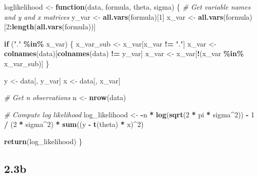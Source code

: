 \documentclass[
]{article}
\newenvironment{Shaded}{\begin{snugshade}}{\end{snugshade}}
\newcommand{\CommentTok}[1]{\textcolor[rgb]{0.56,0.35,0.01}{\textit{#1}}}
\newcommand{\ControlFlowTok}[1]{\textcolor[rgb]{0.13,0.29,0.53}{\textbf{#1}}}
\newcommand{\DecValTok}[1]{\textcolor[rgb]{0.00,0.00,0.81}{#1}}
\newcommand{\FunctionTok}[1]{\textcolor[rgb]{0.13,0.29,0.53}{\textbf{#1}}}
\newcommand{\NormalTok}[1]{#1}
\newcommand{\OtherTok}[1]{\textcolor[rgb]{0.56,0.35,0.01}{#1}}
\newcommand{\SpecialCharTok}[1]{\textcolor[rgb]{0.81,0.36,0.00}{\textbf{#1}}}
\newcommand{\StringTok}[1]{\textcolor[rgb]{0.31,0.60,0.02}{#1}}
\begin{document}
\begin{Shaded}
\begin{Highlighting}[]
\NormalTok{loglikelihood }\OtherTok{\textless{}{-}} \ControlFlowTok{function}\NormalTok{(data, formula, theta, sigma) \{}
  \CommentTok{\# Get variable names and y and x matrices}
\NormalTok{  y\_var }\OtherTok{\textless{}{-}} \FunctionTok{all.vars}\NormalTok{(formula)[}\DecValTok{1}\NormalTok{]}
\NormalTok{  x\_var }\OtherTok{\textless{}{-}} \FunctionTok{all.vars}\NormalTok{(formula)[}\DecValTok{2}\SpecialCharTok{:}\FunctionTok{length}\NormalTok{(}\FunctionTok{all.vars}\NormalTok{(formula))]}
  
  \ControlFlowTok{if}\NormalTok{ (}\StringTok{"."} \SpecialCharTok{\%in\%}\NormalTok{ x\_var) \{}
\NormalTok{    x\_var\_sub }\OtherTok{\textless{}{-}}\NormalTok{ x\_var[x\_var }\SpecialCharTok{!=} \StringTok{"."}\NormalTok{]}
\NormalTok{    x\_var }\OtherTok{\textless{}{-}} \FunctionTok{colnames}\NormalTok{(data)[}\FunctionTok{colnames}\NormalTok{(data) }\SpecialCharTok{!=}\NormalTok{ y\_var]}
\NormalTok{    x\_var }\OtherTok{\textless{}{-}}\NormalTok{ x\_var[}\SpecialCharTok{!}\NormalTok{(x\_var }\SpecialCharTok{\%in\%}\NormalTok{ x\_var\_sub)]}
\NormalTok{  \}}
  
\NormalTok{  y }\OtherTok{\textless{}{-}}\NormalTok{ data[, y\_var]}
\NormalTok{  x }\OtherTok{\textless{}{-}}\NormalTok{ data[, x\_var]}
  
  \CommentTok{\# Get n observations}
\NormalTok{  n }\OtherTok{\textless{}{-}} \FunctionTok{nrow}\NormalTok{(data)}
  
  \CommentTok{\# Compute log likelihood}
\NormalTok{  log\_likelihood }\OtherTok{\textless{}{-}} \SpecialCharTok{{-}}\NormalTok{n }\SpecialCharTok{*} \FunctionTok{log}\NormalTok{(}\FunctionTok{sqrt}\NormalTok{(}\DecValTok{2} \SpecialCharTok{*}\NormalTok{ pi }\SpecialCharTok{*}\NormalTok{ sigma}\SpecialCharTok{\^{}}\DecValTok{2}\NormalTok{)) }\SpecialCharTok{{-}} \DecValTok{1} \SpecialCharTok{/}\NormalTok{ (}\DecValTok{2} \SpecialCharTok{*}\NormalTok{ sigma}\SpecialCharTok{\^{}}\DecValTok{2}\NormalTok{) }\SpecialCharTok{*} \FunctionTok{sum}\NormalTok{((y }\SpecialCharTok{{-}} \FunctionTok{t}\NormalTok{(theta) }\SpecialCharTok{*}\NormalTok{ x)}\SpecialCharTok{\^{}}\DecValTok{2}\NormalTok{)}
  
  \FunctionTok{return}\NormalTok{(log\_likelihood)}
\NormalTok{\}}
\end{Highlighting}
\end{Shaded}

\hypertarget{b}{%
\subsection{2.3b}\label{b}}
\end{document}

